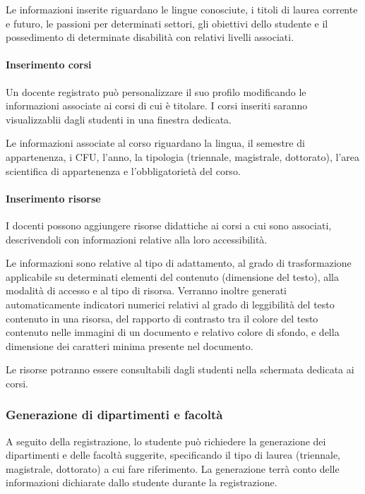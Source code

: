 Le informazioni inserite riguardano le lingue conosciute, i titoli di laurea corrente e futuro, le passioni per determinati settori, gli obiettivi dello studente e il possedimento di determinate disabilità con relativi livelli associati.

\paragraph{Inserimento corsi}
Un docente registrato può personalizzare il suo profilo modificando le informazioni associate ai corsi di cui è titolare. I corsi inseriti saranno visualizzablii dagli studenti in una finestra dedicata.

Le informazioni associate al corso riguardano la lingua, il semestre di appartenenza, i CFU, l'anno, la tipologia (triennale, magistrale, dottorato), l'area scientifica di appartenenza e l'obbligatorietà del corso.

\paragraph{Inserimento risorse}
I docenti possono aggiungere risorse didattiche ai corsi a cui sono associati, descrivendoli con informazioni relative alla loro accessibilità.

 Le informazioni sono relative al tipo di adattamento, al grado di trasformazione applicabile su determinati elementi del contenuto (dimensione del testo), alla modalità di accesso e al tipo di risorsa. Verranno inoltre generati automaticamente indicatori numerici relativi al grado di leggibilità del testo contenuto in una risorsa, del rapporto di contrasto tra il colore del testo contenuto nelle immagini di un documento e relativo colore di sfondo, e della dimensione dei caratteri minima presente nel documento.

Le risorse potranno essere consultabili dagli studenti nella schermata dedicata ai corsi.

\subsubsection{Generazione di dipartimenti e facoltà}
A seguito della registrazione, lo studente può richiedere la generazione dei dipartimenti e delle facoltà suggerite, specificando il tipo di laurea (triennale, magistrale, dottorato) a cui fare riferimento. La generazione terrà conto delle informazioni dichiarate dallo studente durante la registrazione.

